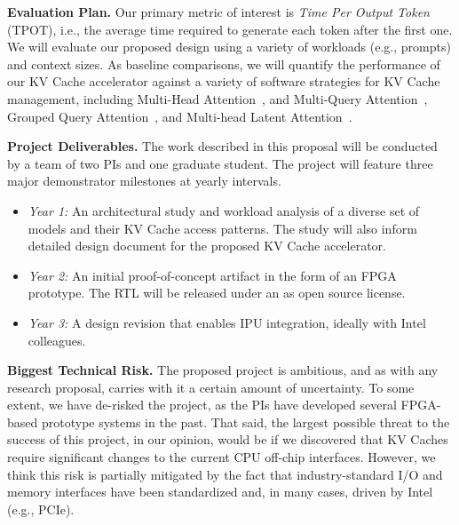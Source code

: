 \documentclass[11pt]{article}
\def\PAR#1{\par\medskip\noindent\textbf{#1}}
\begin{document}
\PAR{Evaluation Plan.}
%
Our primary metric of interest is \emph{Time Per Output Token} (TPOT), i.e., the average time required to generate each token after the first one. We will evaluate our proposed design using a variety of workloads (e.g., prompts) and context sizes. As baseline comparisons, we will quantify the performance of our KV Cache accelerator against a variety of software strategies for KV Cache management, including Multi-Head Attention~\cite{vaswani2017}, and Multi-Query Attention~\cite{shazeer2019}, Grouped Query Attention~\cite{ainslie2023}, and Multi-head Latent Attention~\cite{deepseekv2}.
  

  

\PAR{Project Deliverables.}
%
The work described in this proposal will be conducted by a
team of two PIs and one graduate student. The project will
feature three major demonstrator milestones at yearly intervals.
\begin{itemize}[leftmargin=*]
\item \emph{Year 1:} An architectural study and workload analysis of a diverse set of models and
  their KV Cache access patterns. The study will also inform detailed design document for the
  proposed KV Cache accelerator.
\item \emph{Year 2:} An initial proof-of-concept artifact in the form of an FPGA prototype. The
  RTL will be released under an as open source license.
\item \emph{Year 3:} A design revision that enables IPU integration,
  ideally with Intel colleagues.
\end{itemize}
    

\PAR{Biggest Technical Risk.}
%
The proposed project is ambitious, and as with any research proposal,
carries with it a certain amount of uncertainty.
To some extent, we have de-risked the project, as the PIs
have developed several FPGA-based prototype systems in the past.
That said, the largest possible threat to the success of this
project, in our opinion, would be if we discovered that
KV Caches require significant changes to the current CPU off-chip 
interfaces. However, we think this risk is partially mitigated
by the fact that industry-standard I/O and memory interfaces have
been standardized and, in many cases, driven by Intel (e.g., PCIe).
\end{document}
